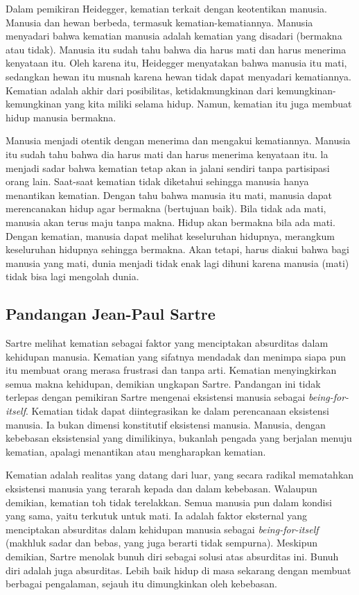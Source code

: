 \documentclass[11pt,twoside,a5paper,openany]{memoir}
\begin{document}
Dalam pemikiran Heidegger, kematian terkait dengan keotentikan manusia.
Manusia dan hewan berbeda, termasuk kematian-kematiannya. Manusia
menyadari bahwa kematian manusia adalah kematian yang disadari (bermakna
atau tidak). Manusia itu sudah tahu bahwa dia harus mati dan harus
menerima kenyataan itu. Oleh karena itu, Heidegger menyatakan bahwa
manusia itu mati, sedangkan hewan itu musnah karena hewan tidak dapat
menyadari kematiannya. Kematian adalah akhir dari posibilitas,
ketidakmungkinan dari kemungkinan-kemungkinan yang kita miliki selama
hidup. Namun, kematian itu juga membuat hidup manusia bermakna.

Manusia menjadi otentik dengan menerima dan mengakui kematiannya.
Manusia itu sudah tahu bahwa dia harus mati dan harus menerima kenyataan
itu. la menjadi sadar bahwa kematian tetap akan ia jalani sendiri tanpa
partisipasi orang lain. Saat-saat kematian tidak diketahui sehingga
manusia hanya menantikan kematian. Dengan tahu bahwa manusia itu mati,
manusia dapat merencanakan hidup agar bermakna (bertujuan baik). Bila
tidak ada mati, manusia akan terus maju tanpa makna. Hidup akan bermakna
bila ada mati. Dengan kematian, manusia dapat melihat keseluruhan
hidupnya, merangkum keseluruhan hidupnya sehingga bermakna. Akan tetapi,
harus diakui bahwa bagi manusia yang mati, dunia menjadi tidak enak lagi
dihuni karena manusia (mati) tidak bisa lagi mengolah dunia.

\hypertarget{pandangan-jean-paul-sartre-1}{%
\subsection{Pandangan Jean-Paul
Sartre}\label{pandangan-jean-paul-sartre-1}}

Sartre melihat kematian sebagai faktor yang menciptakan absurditas dalam
kehidupan manusia. Kematian yang sifatnya mendadak dan menimpa siapa pun
itu membuat orang merasa frustrasi dan tanpa arti. Kematian
menyingkirkan semua makna kehidupan, demikian ungkapan Sartre. Pandangan
ini tidak terlepas dengan pemikiran Sartre mengenai eksistensi manusia
sebagai \emph{being-for-itself}. Kematian tidak dapat diintegrasikan ke
dalam perencanaan eksistensi manusia. Ia bukan dimensi konstitutif
eksistensi manusia. Manusia, dengan kebebasan eksistensial yang
dimilikinya, bukanlah pengada yang berjalan menuju kematian, apalagi
menantikan atau mengharapkan kematian.

Kematian adalah realitas yang datang dari luar, yang secara radikal
mematahkan eksistensi manusia yang terarah kepada dan dalam kebebasan.
Walaupun demikian, kematian toh tidak terelakkan. Semua manusia pun
dalam kondisi yang sama, yaitu terkutuk untuk mati. Ia adalah faktor
eksternal yang menciptakan absurditas dalam kehidupan manusia sebagai
\emph{being-for-itself} (makhluk sadar dan bebas, yang juga berarti
tidak sempurna). Meskipun demikian, Sartre menolak bunuh diri sebagai
solusi atas absurditas ini. Bunuh diri adalah juga absurditas. Lebih
baik hidup di masa sekarang dengan membuat berbagai pengalaman, sejauh
itu dimungkinkan oleh kebebasan.
\end{document}
